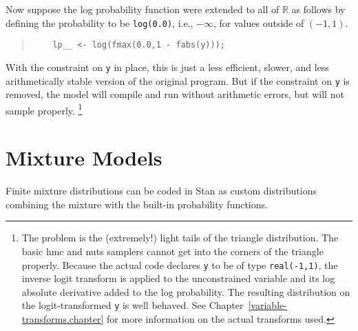 \documentclass[10pt]{report}
\newcommand{\Stan}{Stan\xspace}
\newcommand{\acronym}[1]{{\sc #1}\xspace}
\newcommand{\HMC}{\acronym{hmc}}
\newcommand{\NUTS}{\acronym{nuts}}
\newcommand{\code}[1]{{\tt #1}}
\newcommand{\reals}{\mathbb{R}}
\newcommand{\refchapter}[1]{Chapter~\ref{#1.chapter}}
\begin{document}
Now suppose the log probability function were extended to all of
$\reals$ as follows by defining the probability to be \code{log(0.0)},
i.e., $-\infty$, for values outside of $(-1,1)$.
%
\begin{quote}
\begin{Verbatim}
    lp__ <- log(fmax(0.0,1 - fabs(y)));
\end{Verbatim}
\end{quote}
%
With the constraint on \code{y} in place, this is just a less
efficient, slower, and less arithmetically stable version of the
original program.  But if the constraint on \code{y} is removed, 
the model will compile and run without arithmetic errors, but will not
sample properly.%
%
\footnote{The problem is the (extremely!) light tails of the triangle
  distribution.  The basic \HMC and \NUTS samplers cannot get into the
  corners of the triangle properly.  Because the actual code declares
  \code{y} to be of type \code{real(-1,1)}, the inverse logit
  transform is applied to the unconstrained variable and its log
  absolute derivative added to the log probability.  The resulting
  distribution on the logit-transformed \code{y} is well behaved.  See
  \refchapter{variable-transforms} for more information on the actual
  transforms used.}


\section{Mixture Models}

Finite mixture distributions can be coded in \Stan as custom
distributions combining the mixture with the built-in probability
functions.  
\end{document}
